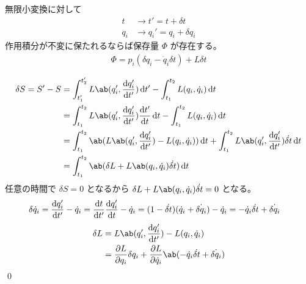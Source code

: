 \documentclass[uplatex,dvipdfmx,a4paper,11pt]{jlreq}
\makeatletter
\numberwithin{equation}{section}
\theoremstyle{definition}
\renewenvironment{proof}[1][\proofname]{\par
  \normalfont
  \topsep6\p@\@plus6\p@ \trivlist
  \item[\hskip\labelsep{\bfseries #1}\@addpunct{\bfseries}]\ignorespaces\quad\par
}{%
  \qed\endtrivlist\@endpefalse
}
\renewcommand\proofname{証明}
\makeatother
\begin{document}
\begin{theorem}
  無限小変換に対して
  \begin{align}
    t   & \to t' = t + \delta t       \\
    q_i & \to q_i' = q_i + \delta q_i
  \end{align}
  作用積分が不変に保たれるならば保存量 $\Phi$ が存在する。
  \begin{align}
    \Phi = p_i(\delta q_i - \dot{q}_i\delta t) + L\delta t
  \end{align}
\end{theorem}
\begin{proof}
  \begin{align}
    \delta S = S' - S & = \int_{t_1'}^{t_2'}L\ab(q_i', \diff{q_i'}{t'})\dl{t'} - \int_{t_1}^{t_2}L(q_i, \dot{q}_i)\dl{t}                                               \\
                      & = \int_{t_1}^{t_2}L\ab(q_i', \diff{q_i'}{t'})\diff{t'}{t}\dl{t} - \int_{t_1}^{t_2}L(q_i, \dot{q}_i)\dl{t}                                      \\
                      & = \int_{t_1}^{t_2}\ab(L\ab(q_i', \diff{q_i'}{t'}) - L(q_i, \dot{q}_i))\dl{t} + \int_{t_1}^{t_2}L\ab(q_i', \diff{q_i'}{t'})\dot{\delta t}\dl{t} \\
                      & = \int_{t_1}^{t_2}\ab(\delta L + L\ab(q_i, \dot{q}_i)\dot{\delta t})\dl{t}
  \end{align}
  任意の時間で $\delta S = 0$ となるから $\delta L + L\ab(q_i, \dot{q}_i)\dot{\delta t} = 0$ となる。
  \begin{align}
    \delta\dot{q}_i & = \diff{q_i'}{t'} - \dot{q}_i = \diff{t}{t'}\diff{q_i'}{t} - \dot{q}_i = (1 - \dot{\delta t})(\dot{q}_i + \dot{\delta q_i}) - \dot{q}_i = - \dot{q}_i\dot{\delta t} + \dot{\delta q_i}
  \end{align}
  \begin{align}
    \delta L                                      & = L\ab(q_i', \diff{q_i'}{t'}) - L(q_i, \dot{q}_i)                                                                                                                                                                                                      \\
                                                  & = \diffp{L}{q_i}\delta q_i + \diffp{L}{\dot{q}_i}\ab(- \dot{q}_i\dot{\delta t} + \dot{\delta q_i})                                                                                                                                                     \\

\end{align}
\end{proof}
\end{document}
